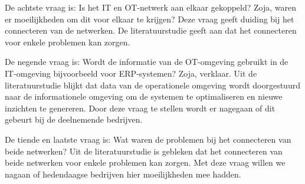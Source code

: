 De achtste vraag is: Is het IT en OT-netwerk aan elkaar gekoppeld? Zoja, waren er moeilijkheden om dit voor elkaar te krijgen? Deze vraag geeft duiding bij het connecteren van de netwerken. De literatuurstudie geeft aan dat het connecteren voor enkele problemen kan zorgen. 

De negende vraag is: Wordt de informatie van de OT-omgeving gebruikt in de IT-omgeving bijvoorbeeld voor ERP-systemen? Zoja, verklaar. Uit de literatuurstudie blijkt dat data van de operationele omgeving wordt doorgestuurd naar de informationele omgeving om de systemen te optimaliseren en nieuwe inzichten te genereren. Door deze vraag te stellen wordt er nagegaan of dit gebeurt bij de deelnemende bedrijven.

De tiende en laatste vraag is: Wat waren de problemen bij het connecteren van beide netwerken? Uit de literatuurstudie is gebleken dat het connecteren van beide netwerken voor enkele problemen kan zorgen. Met deze vraag willen we nagaan of hedendaagse bedrijven hier moeilijkheden mee hadden. 



